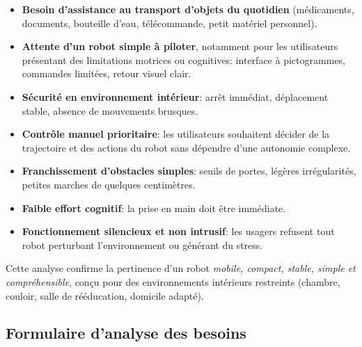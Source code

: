 \documentclass[12pt,a4paper]{article}
\begin{document}
\begin{itemize}
    \item \textbf{Besoin d’assistance au transport d’objets du quotidien}  
    (médicaments, documents, bouteille d’eau, télécommande, petit matériel personnel).

    \item \textbf{Attente d’un robot simple à piloter}, notamment pour les utilisateurs présentant
    des limitations motrices ou cognitives: interface à pictogrammes, commandes limitées,
    retour visuel clair.

    \item \textbf{Sécurité en environnement intérieur}: arrêt immédiat, déplacement stable,
    absence de mouvements brusques.

    \item \textbf{Contrôle manuel prioritaire}: les utilisateurs souhaitent décider de la trajectoire
    et des actions du robot sans dépendre d’une autonomie complexe.

    \item \textbf{Franchissement d’obstacles simples}: seuils de portes, légères irrégularités,
    petites marches de quelques centimètres.

    \item \textbf{Faible effort cognitif}: la prise en main doit être immédiate.

    \item \textbf{Fonctionnement silencieux et non intrusif}: les usagers refusent tout robot
    perturbant l’environnement ou générant du stress.\\
\end{itemize}

Cette analyse confirme la pertinence d’un robot \emph{mobile, compact, stable, simple et
compréhensible}, conçu pour des environnements intérieurs restreints (chambre,
couloir, salle de rééducation, domicile adapté).


\subsection{Formulaire d’analyse des besoins}
\end{document}

